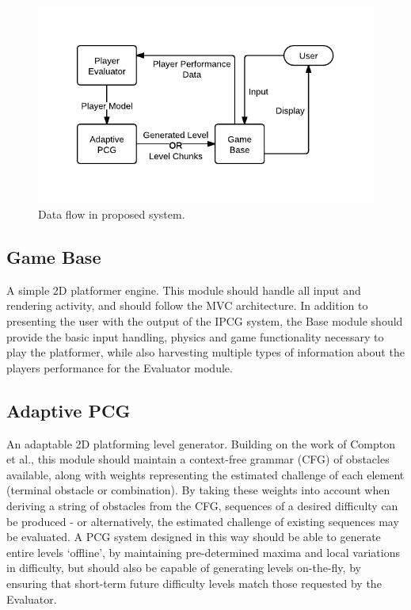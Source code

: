 \documentclass[a4paper,oneside,12pt,openany]{memoir}
\begin{document}
\begin{figure}[htbp]
  \centering
  \includegraphics{system}
  \caption{Data flow in proposed system.}
  \label{Figure:dataflow}
\end{figure}
\subsection{Game Base}
A simple 2D platformer engine. This module should handle all input and rendering activity, and should follow the MVC architecture. In addition to presenting the user with the output of the IPCG system, the Base module should provide the basic input handling, physics and game functionality necessary to play the platformer, while also harvesting multiple types of information about the players performance for the Evaluator module. 
\subsection{Adaptive PCG}
An adaptable 2D platforming level generator. Building on the work of Compton et al.\cite{compton2006procedural}, this module should maintain a context-free grammar (CFG) of obstacles available, along with weights representing the estimated challenge of each element (terminal obstacle or combination). By taking these weights into account when deriving a string of obstacles from the CFG, sequences of a desired difficulty can be produced - or alternatively, the estimated challenge of existing sequences may be evaluated. A PCG system designed in this way should be able to generate entire levels `offline', by maintaining pre-determined maxima and local variations in difficulty, but should also be capable of generating levels on-the-fly, by ensuring that short-term future difficulty levels match those requested by the Evaluator.
\end{document}
